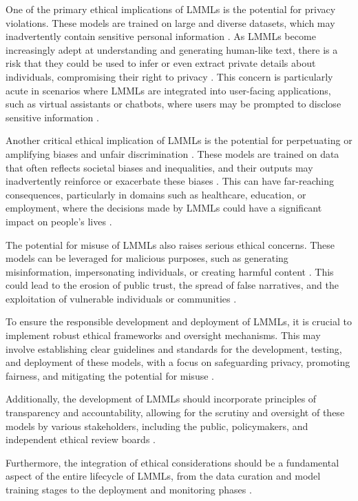 \documentclass[11pt]{article}
\begin{document}
One of the primary ethical implications of LMMLs is the potential for privacy violations. These models are trained on large and diverse datasets, which may inadvertently contain sensitive personal information \cite{ref227}. As LMMLs become increasingly adept at understanding and generating human-like text, there is a risk that they could be used to infer or even extract private details about individuals, compromising their right to privacy \cite{ref79}. This concern is particularly acute in scenarios where LMMLs are integrated into user-facing applications, such as virtual assistants or chatbots, where users may be prompted to disclose sensitive information \cite{ref228}.

Another critical ethical implication of LMMLs is the potential for perpetuating or amplifying biases and unfair discrimination \cite{ref229}. These models are trained on data that often reflects societal biases and inequalities, and their outputs may inadvertently reinforce or exacerbate these biases \cite{ref82}. This can have far-reaching consequences, particularly in domains such as healthcare, education, or employment, where the decisions made by LMMLs could have a significant impact on people's lives \cite{ref230}.

The potential for misuse of LMMLs also raises serious ethical concerns. These models can be leveraged for malicious purposes, such as generating misinformation, impersonating individuals, or creating harmful content \cite{ref85}. This could lead to the erosion of public trust, the spread of false narratives, and the exploitation of vulnerable individuals or communities \cite{ref86,ref81,ref79}.

To ensure the responsible development and deployment of LMMLs, it is crucial to implement robust ethical frameworks and oversight mechanisms. This may involve establishing clear guidelines and standards for the development, testing, and deployment of these models, with a focus on safeguarding privacy, promoting fairness, and mitigating the potential for misuse \cite{ref84}.

Additionally, the development of LMMLs should incorporate principles of transparency and accountability, allowing for the scrutiny and oversight of these models by various stakeholders, including the public, policymakers, and independent ethical review boards \cite{ref231,ref232,ref233}.

Furthermore, the integration of ethical considerations should be a fundamental aspect of the entire lifecycle of LMMLs, from the data curation and model training stages to the deployment and monitoring phases \cite{ref234,ref235}.
\end{document}
